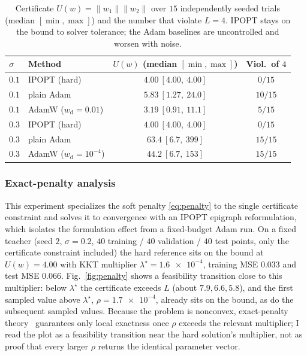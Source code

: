 \documentclass[conference]{IEEEtran}
\newcommand{\wvec}{w}
\newcommand{\Lmax}{L}
\newcommand{\wdcoef}{w_{\mathrm{d}}}
\newcommand{\Uc}{U(\wvec)}
\newcommand{\norm}[1]{\lVert #1 \rVert}
\begin{document}
\begin{table}[t]
\caption{Certificate $\Uc=\norm{\wvec_1}\norm{\wvec_2}$ over $15$ independently
seeded trials (median $[\min,\max]$) and the number that violate $\Lmax=4$. IPOPT
stays on the bound to solver tolerance; the Adam baselines are uncontrolled and
worsen with noise.}
\label{tab:sens}
\centering\setlength{\tabcolsep}{4pt}\footnotesize
\begin{tabular}{@{}llcc@{}}
\toprule
$\sigma$ & Method & $\Uc$ (median $[\min,\max]$) & Viol.\ of $4$\\
\midrule
$0.1$ & IPOPT (hard)                 & $4.00\ [4.00,\ 4.00]$   & $0/15$\\
$0.1$ & plain Adam                   & $5.83\ [1.27,\ 24.0]$   & $10/15$\\
$0.1$ & AdamW ($\wdcoef=0.01$)       & $3.19\ [0.91,\ 11.1]$   & $5/15$\\
$0.3$ & IPOPT (hard)                 & $4.00\ [4.00,\ 4.00]$   & $0/15$\\
$0.3$ & plain Adam                   & $63.4\ [6.7,\ 399]$     & $15/15$\\
$0.3$ & AdamW ($\wdcoef=10^{-4}$)    & $44.2\ [6.7,\ 153]$     & $15/15$\\
\bottomrule
\end{tabular}
\end{table}

\subsubsection{Exact-penalty analysis}
This experiment specializes the soft penalty \eqref{eq:penalty} to the single
certificate constraint and solves it to convergence with an IPOPT epigraph
reformulation, which isolates the formulation effect from a fixed-budget Adam run. On
a fixed teacher (seed $2$, $\sigma=0.2$, $40$ training / $40$ validation / $40$ test
points, only the certificate constraint included) the hard reference sits on the
bound at $\Uc=4.00$ with KKT multiplier $\lambda^\star=\num{1.6e-4}$, training MSE
$0.033$ and test MSE $0.066$. Fig.~\ref{fig:penalty} shows a feasibility transition
close to this multiplier: below $\lambda^\star$ the certificate exceeds $\Lmax$
(about $7.9,6.6,5.8$), and the first sampled value above $\lambda^\star$,
$\rho=\num{1.7e-4}$, already sits on the bound, as do the subsequent sampled values.
Because the problem is nonconvex, exact-penalty theory~\cite{nocedalwright}
guarantees only local exactness once $\rho$ exceeds the relevant multiplier; I read
the plot as a feasibility transition near the hard solution's multiplier, not as
proof that every larger $\rho$ returns the identical parameter vector.
\end{document}

